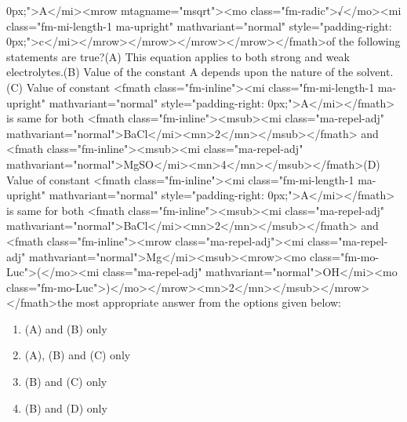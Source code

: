 \documentclass{article}
\begin{document}
0px;">A</mi><mrow mtagname="msqrt"><mo class="fm-radic">√</mo><mi class="fm-mi-length-1 ma-upright" mathvariant="normal" style="padding-right: 0px;">c</mi></mrow></mrow></mrow></mrow></fmath>\newlineWhich of the following statements are true?\newline(A) This equation applies to both strong and weak electrolytes.\newline(B) Value of the constant A depends upon the nature of the solvent.\newline(C) Value of constant <fmath class="fm-inline"><mi class="fm-mi-length-1 ma-upright" mathvariant="normal" style="padding-right: 0px;">A</mi></fmath> is same for both <fmath class="fm-inline"><msub><mi class="ma-repel-adj" mathvariant="normal">BaCl</mi><mn>2</mn></msub></fmath> and <fmath class="fm-inline"><msub><mi class="ma-repel-adj" mathvariant="normal">MgSO</mi><mn>4</mn></msub></fmath>\newline(D) Value of constant <fmath class="fm-inline"><mi class="fm-mi-length-1 ma-upright" mathvariant="normal" style="padding-right: 0px;">A</mi></fmath> is same for both <fmath class="fm-inline"><msub><mi class="ma-repel-adj" mathvariant="normal">BaCl</mi><mn>2</mn></msub></fmath> and <fmath class="fm-inline"><mrow class="ma-repel-adj"><mi class="ma-repel-adj" mathvariant="normal">Mg</mi><msub><mrow><mo class="fm-mo-Luc">(</mo><mi class="ma-repel-adj" mathvariant="normal">OH</mi><mo class="fm-mo-Luc">)</mo></mrow><mn>2</mn></msub></mrow></fmath>\newlineChoose the most appropriate answer from the options given below:\newline 
\begin{enumerate}[label=(\alph*)]
\item  (A) and (B) only
\item  (A), (B) and (C) only
\item  (B) and (C) only
\item  (B) and (D) only
\end{enumerate}
\newpage
\end{document}
